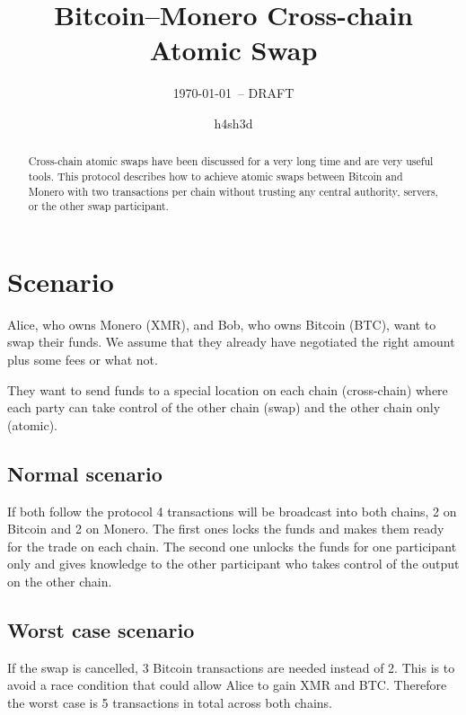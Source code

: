 \documentclass{llncs}
\begin{document}
\title{Bitcoin--Monero Cross-chain Atomic Swap}
\author{h4sh3d}

\subtitle{{\normalsize\today{\small\ -- DRAFT}}}

\maketitle

\begin{abstract}
    Cross-chain atomic swaps have been discussed for a very long time and are very useful tools. This protocol describes how to achieve atomic swaps between Bitcoin and Monero with two transactions per chain without trusting any central authority, servers, or the other swap participant.
\end{abstract}

\section{Scenario}
Alice, who owns Monero (XMR), and Bob, who owns Bitcoin (BTC), want to swap their funds. We assume that they already have negotiated the right amount plus some fees or what not.

They want to send funds to a special location on each chain (cross-chain) where each party can take control of the other chain (swap) and the other chain only (atomic).

\subsection{Normal scenario}
If both follow the protocol 4 transactions will be broadcast into both chains, 2 on Bitcoin and 2 on Monero. The first ones locks the funds and makes them ready for the trade on each chain. The second one unlocks the funds for one participant only and gives knowledge to the other participant who takes control of the output on the other chain.

\subsection{Worst case scenario}
If the swap is cancelled, 3 Bitcoin transactions are needed instead of 2. This is to avoid a race condition that could allow Alice to gain XMR and BTC. Therefore the worst case is 5 transactions in total across both chains.
\end{document}
